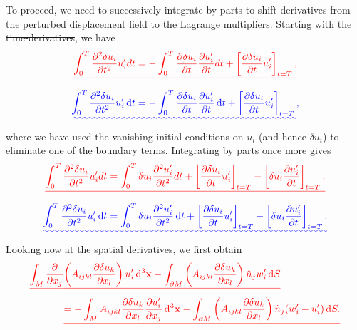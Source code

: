 \documentclass[a4paper,12pt]{paper}
\providecommand{\DIFadd}[1]{{\protect\color{blue}\uwave{#1}}} %
\providecommand{\DIFdel}[1]{{\protect\color{red}\sout{#1}}}                      %
\providecommand{\DIFaddbegin}{} %
\providecommand{\DIFaddend}{} %
\providecommand{\DIFdelbegin}{} %
\providecommand{\DIFdelend}{} %
\begin{document}
To proceed, we need to successively integrate by parts to shift derivatives from the perturbed 
displacement field to the Lagrange multipliers. Starting with the \DIFdelbegin \DIFdel{time-derivatives}\DIFdelend \DIFaddbegin \DIFadd{time derivatives}\DIFaddend , we have
\DIFdelbegin \begin{displaymath}
\DIFdel{\int_{0}^{T}\frac{\partial^{2}\delta u_{i}}{\partial t^{2}}u_{i}'dt = -\int_{0}^{T}\frac{\partial\delta u_{i}}{\partial t}\frac{\partial u_{i}'}{\partial t}dt+\left[\frac{\partial\delta u_{i}}{\partial t}u_{i}'\right]_{t=T},
}\end{displaymath}%
\DIFdelend \DIFaddbegin \begin{equation}
\DIFadd{\int_{0}^{T}\frac{\partial^{2}\delta u_{i}}{\partial t^{2}}u_{i}'\dd t = -\int_{0}^{T}\frac{\partial\delta u_{i}}{\partial t}\frac{\partial u_{i}'}{\partial t}\dd t+\left[\frac{\partial\delta u_{i}}{\partial t}u_{i}'\right]_{t=T},
\label{eq:21}
}\end{equation}\DIFaddend 
where we have used the vanishing initial conditions on $u_{i}$ (and hence $\delta u_{i}$) to eliminate one 
of the boundary terms. Integrating by parts once more gives
\DIFdelbegin \begin{displaymath}
\DIFdel{\int_{0}^{T}\frac{\partial^{2}\delta u_{i}}{\partial t^{2}}u_{i}'dt = \int_{0}^{T}\delta u_{i}\frac{\partial^{2}u_{i}'}{\partial t^{2}}dt+\left[\frac{\partial\delta u_{i}}{\partial t}u_{i}'\right]_{t=T}-\left[\delta u_{i}\frac{\partial u_{i}'}{\partial t}\right]_{t=T}.
}\end{displaymath}%
\DIFdelend \DIFaddbegin \begin{equation}
\DIFadd{\int_{0}^{T}\frac{\partial^{2}\delta u_{i}}{\partial t^{2}}u_{i}'\dd t = \int_{0}^{T}\delta u_{i}\frac{\partial^{2}u_{i}'}{\partial t^{2}}\dd t+\left[\frac{\partial\delta u_{i}}{\partial t}u_{i}'\right]_{t=T}-\left[\delta u_{i}\frac{\partial u_{i}'}{\partial t}\right]_{t=T}.
\label{eq:22}
}\end{equation}\DIFaddend 
Looking now at the spatial derivatives, we first obtain
\DIFdelbegin \begin{align*}
\DIFdel{\int_{M}\frac{\partial}{\partial x_{j}}}&\DIFdel{\left(A_{ijkl}\frac{\partial\delta u_{k}}{\partial x_{l}}\right)u_{i}'\dd^{3}\mathbf{x} - \int_{\partial M}\left(A_{ijkl}\frac{\partial\delta u_{k}}{\partial x_{l}}\right)\hat{n}_{j}w_{i}'\dd S \nonumber }\\
&\DIFdel{= -\int_{M}A_{ijkl}\frac{\partial\delta u_{k}}{\partial x_{l}}\frac{\partial u_{i}'}{\partial x_{j}}\dd^{3}\mathbf{x} - \int_{\partial M}\left(A_{ijkl}\frac{\partial\delta u_{k}}{\partial x_{l}}\right)\hat{n}_{j}(w_{i}'-u_{i}')\dd S.
}\end{align*}%
\end{document}
